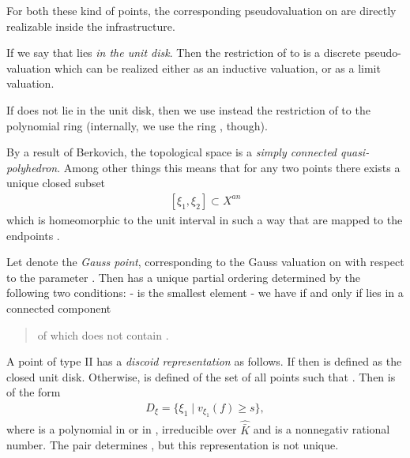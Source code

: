 \documentclass[letterpaper,10pt,english]{sphinxmanual}
\begin{document}
For both these kind of points, the corresponding pseudovaluation on  are
directly realizable inside the  infrastructure.

If  we say that  lies \emph{in the unit disk}. Then the
restriction of  to  is a discrete pseudo-valuation which can be
realized either as an inductive valuation, or as a limit valuation.

If  does not lie in the unit disk, then we use instead the restriction
of  to the polynomial ring  (internally, we use the ring
, though).

By a result of Berkovich, the topological space  is a \emph{simply connected
quasi-polyhedron}. Among other things this means that for any two points
 there exists a unique closed subset
\begin{equation*}
\begin{split}[\xi_1,\xi_2]\subset X^{an}\end{split}
\end{equation*}
which is homeomorphic to the unit interval  in such a way that
 are mapped to the endpoints .

Let  denote the \emph{Gauss point}, corresponding to the Gauss
valuation on  with respect to the parameter . Then  has a
unique partial ordering determined by the following two conditions:
-  is the smallest element
- we have  if and only if  lies in a connected component
\begin{quote}

of  which does not contain .
\end{quote}

A point  of type II has a \emph{discoid representation} as follows. If
 then  is defined as the closed unit disk. Otherwise,
 is defined of the set of all points  such that
. Then  is of the form
\begin{equation*}
\begin{split}D_\xi = \{ \xi_1 \mid v_{\xi_1}(f) \geq s\},\end{split}
\end{equation*}
where  is a polynomial in  or in , irreducible over
\(\hat{\bar{K}}\) and  is a nonnegativ rational number.
The pair  determines , but this representation is not unique.
\end{document}

